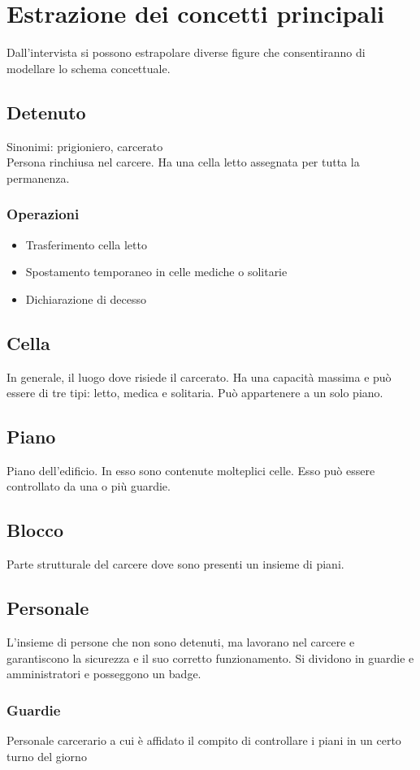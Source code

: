 \documentclass[a4paper,12pt]{report}
\begin{document}
\section{Estrazione dei concetti principali}
Dall'intervista si possono estrapolare diverse figure che consentiranno di modellare lo schema concettuale.
\subsection*{Detenuto}
Sinonimi: prigioniero, carcerato
%
\\Persona rinchiusa nel carcere.
%
Ha una cella letto assegnata per tutta la permanenza.
%
\subsubsection*{Operazioni}
\begin{itemize}
    \item Trasferimento cella letto
    \item Spostamento temporaneo in celle mediche o solitarie
    \item Dichiarazione di decesso
\end{itemize}
\subsection*{Cella}
In generale, il luogo dove risiede il carcerato.
%
Ha una capacità massima e può essere di tre tipi: letto, medica e solitaria.
%
Può appartenere a un solo piano.
\subsection*{Piano}
Piano dell'edificio. In esso sono contenute molteplici celle.
%
Esso può essere controllato da una o più guardie.
\subsection*{Blocco}
Parte strutturale del carcere dove sono presenti un insieme di piani.
\subsection*{Personale}
L'insieme di persone che non sono detenuti, ma lavorano nel carcere e garantiscono la sicurezza e il suo corretto funzionamento.
%
Si dividono in guardie e amministratori e posseggono un badge.
\subsubsection*{Guardie}
Personale carcerario a cui è affidato il compito di controllare i piani in un certo turno del giorno 
\end{document}
